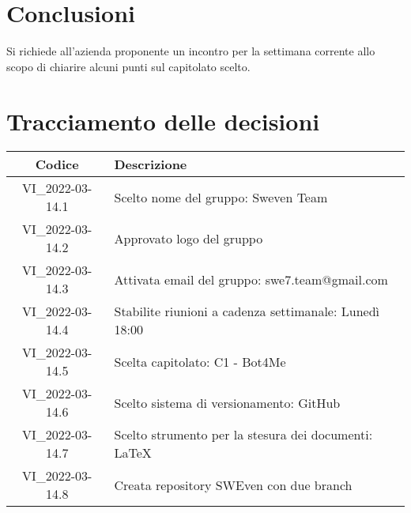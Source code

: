 \section{Conclusioni}
Si richiede all'azienda proponente un incontro per la settimana corrente allo scopo di chiarire alcuni punti sul capitolato scelto.
\newpage

\section*{Tracciamento delle decisioni}
	\renewcommand{\arraystretch}{1.8}
	\begin{tabular}{ |c|l| }
		\hline
		\textbf{Codice} & \textbf{Descrizione} \\
		\hline
		VI\_2022-03-14.1 & Scelto nome del gruppo: Sweven Team \\ \hline
		VI\_2022-03-14.2 & Approvato logo del gruppo\\ \hline
		VI\_2022-03-14.3 & Attivata email del gruppo: swe7.team@gmail.com\\ \hline
		VI\_2022-03-14.4 & Stabilite riunioni a cadenza settimanale: Lunedì 18:00\\ \hline
	        VI\_2022-03-14.5 & Scelta capitolato: C1 - Bot4Me\\ \hline
		VI\_2022-03-14.6 & Scelto sistema di versionamento: GitHub\\ \hline
		VI\_2022-03-14.7 & Scelto strumento per la stesura dei documenti: \LaTeX\\ \hline
        	VI\_2022-03-14.8 & Creata repository SWEven con due branch\\
		\hline
	\end{tabular}